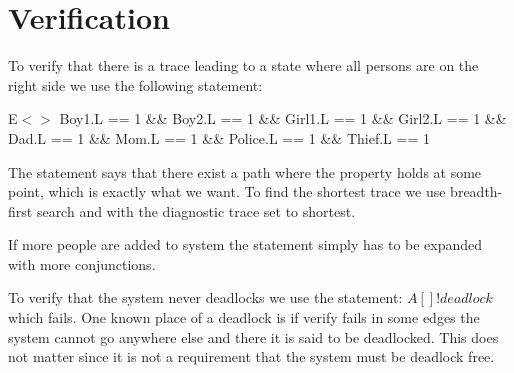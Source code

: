 \section{Verification}
To verify that there is a trace leading to a state where all persons are on the right side we use the following statement:

E$<>$ Boy1.L == 1 \&\& Boy2.L == 1 \&\& Girl1.L == 1 \&\& Girl2.L == 1 \&\& Dad.L == 1 \&\& Mom.L == 1 \&\& Police.L == 1 \&\& Thief.L == 1

The statement says that there exist a path where the property holds at some point, which is exactly what we want. 
To find the shortest trace we use breadth-first search and with the diagnostic trace set to shortest. 

If more people are added to system the statement simply has to be expanded with more conjunctions. 

To verify that the system never deadlocks we use the statement:
$A[] !deadlock$ which fails. 
One known place of a deadlock is if verify fails in some edges the system cannot go anywhere else and there it is said to be deadlocked. 
This does not matter since it is not a requirement that the system must be deadlock free. 